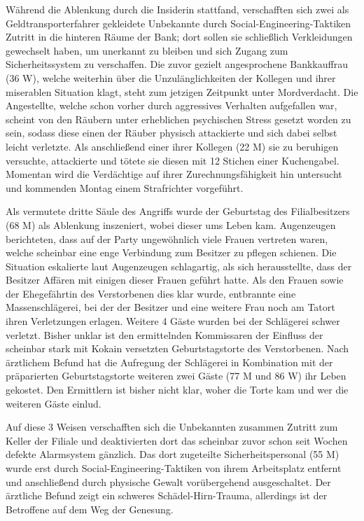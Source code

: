\documentclass[final]{multiversum}
\begin{document}
Während die Ablenkung durch die Insiderin stattfand, verschafften sich zwei als
Geldtransporterfahrer gekleidete Unbekannte durch Social-Engineering-Taktiken
Zutritt in die hinteren Räume der Bank; dort sollen sie schließlich Verkleidungen
gewechselt haben, um unerkannt zu bleiben und sich Zugang zum Sicherheitssystem
zu verschaffen. Die zuvor gezielt angesprochene Bankkauffrau (36 W), welche
weiterhin über die Unzulänglichkeiten der Kollegen und ihrer miserablen
Situation klagt, steht zum jetzigen Zeitpunkt unter Mordverdacht. Die
Angestellte, welche schon vorher durch aggressives Verhalten aufgefallen war,
scheint von den Räubern unter erheblichen psychischen Stress gesetzt worden zu
sein, sodass diese einen der Räuber physisch attackierte und sich dabei selbst
leicht verletzte. Als anschließend einer ihrer Kollegen (22 M) sie zu beruhigen
versuchte, attackierte und tötete sie diesen mit 12 Stichen einer Kuchengabel.
Momentan wird die Verdächtige auf ihrer Zurechnungsfähigkeit hin untersucht und
kommenden Montag einem Strafrichter vorgeführt.

Als vermutete dritte Säule des Angriffs wurde der Geburtstag des Filialbesitzers
(68 M) als Ablenkung inszeniert, wobei dieser ums Leben kam. Augenzeugen
berichteten, dass auf der Party ungewöhnlich viele Frauen vertreten waren,
welche scheinbar eine enge Verbindung zum Besitzer zu pflegen schienen. Die
Situation eskalierte laut Augenzeugen schlagartig, als sich herausstellte, dass
der Besitzer Affären mit einigen dieser Frauen geführt hatte. Als den
Frauen sowie der Ehegefährtin des Verstorbenen dies klar wurde, entbrannte
eine Massenschlägerei, bei der der Besitzer und eine weitere Frau noch am Tatort
ihren Verletzungen erlagen. Weitere 4 Gäste wurden bei der Schlägerei schwer
verletzt. Bisher unklar ist den ermittelnden Kommissaren der Einfluss der
scheinbar stark mit Kokain versetzten Geburtstagstorte des Verstorbenen. Nach
ärztlichem Befund hat die Aufregung der Schlägerei in Kombination mit der
präparierten Geburtstagstorte weiteren zwei Gäste (77 M und 86 W) ihr Leben
gekostet. Den Ermittlern ist bisher nicht klar, woher die Torte kam und wer die
weiteren Gäste einlud.

Auf diese 3 Weisen verschafften sich die Unbekannten zusammen Zutritt zum Keller
der Filiale und deaktivierten dort das scheinbar zuvor schon seit Wochen defekte
Alarmsystem gänzlich. Das dort zugeteilte Sicherheitspersonal (55 M) wurde erst
durch Social-Engineering-Taktiken von ihrem Arbeitsplatz entfernt und
anschließend durch physische Gewalt vorübergehend ausgeschaltet. Der ärztliche
Befund zeigt ein schweres Schädel-Hirn-Trauma, allerdings ist der Betroffene auf
dem Weg der Genesung.
\end{document}
